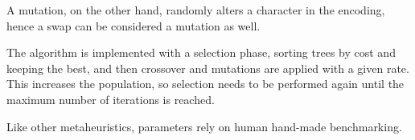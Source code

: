 A mutation, on the other hand, randomly alters a character in the encoding, hence a swap can be considered a mutation as well.

The algorithm is implemented with a selection phase, sorting trees by cost and keeping the best, and then crossover and mutations are applied with a given rate. This increases the population, so selection needs to be performed again until the maximum number of iterations is reached.

Like other metaheuristics, parameters rely on human hand-made benchmarking.
